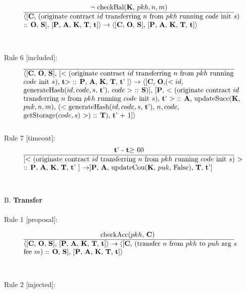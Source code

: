 \documentclass[a4paper]{llncs}
\begin{document}
\begin{equation}{}
\frac{\text{$\neg$ checkBal(\MANAGERS, $pkh, n, m$)}}{\parbox{4.2in}{\text{$\langle$[\ACCOUNTS, (originate contract ${id}$ transferring  ${n}$ from ${pkh}$ running ${code}$ init ${s}$)} \text{:: \OPERATIONS, \CONTRACTS], [\PENDING, \ACCEPTED, \MANAGERS, \CONTRACTORS, \TIME]$\rangle \rightarrow \langle$[\ACCOUNTS, \OPERATIONS, \CONTRACTS],} \text{[\PENDING, \ACCEPTED, \MANAGERS, \CONTRACTORS, \TIME]$\rangle$}}} 
\end{equation}
~\\
~\\
Rule 6 [included]:
\begin{equation}{}
\frac{}{\parbox{4.2in}{\text{$\langle$[\ACCOUNTS, \OPERATIONS, \CONTRACTS], [$<$ (originate contract ${id}$ transferring  ${n}$ from ${pkh}$ running } \\
\text{${code}$ init ${s}$), \TIME $>$ :: \PENDING, \ACCEPTED, \MANAGERS, \CONTRACTORS, \TIME' ]$\rangle \rightarrow \langle$[\ACCOUNTS, \OPERATIONS,($< id$, } \\
\text{generateHash($id, code, s$, \TIME'), $code >$ :: \CONTRACTS)], [\PENDING, $<$ (originate contract ${id}$ } \\
\text{transferring  ${n}$ from ${pkh}$ running ${code}$ init ${s}$), \TIME' $>$ :: \ACCEPTED, updateSucc(\MANAGERS, } \\
\text{$puk, n, m$), ($<$ generateHash($id, code, s$, \TIME'), $n, code$, } \\
 \text{getStorage($code, s$) $>$) :: \CONTRACTORS), \TIME' + 1]$\rangle$}}} 
\end{equation}
~\\
Rule 7 [timeout]:
\begin{equation}{}
\frac{\text{\TIME' - \TIME $\ge$ 60}}{\parbox{4.2in}{\text{[$<$ (originate contract ${id}$ transferring  ${n}$ from ${pkh}$ running ${code}$ init ${s}$) $>$ } \\
\text{:: \PENDING, \ACCEPTED, \MANAGERS, \CONTRACTORS, \TIME' ] $\rightarrow$[\PENDING, \ACCEPTED, updateCou(\MANAGERS, $puk$, False), \CONTRACTORS, \TIME']}}} 
\end{equation}
~\\
~\\
B. \textbf{Transfer}
\\
~\\
Rule 1 [proposal]:

\begin{equation}{}
\frac{\text{checkAcc($pkh$, \ACCOUNTS)  }}{\parbox{4.2in}{\text{$\langle$[\ACCOUNTS, \OPERATIONS, \CONTRACTS], [\PENDING, \ACCEPTED, \MANAGERS, \CONTRACTORS, \TIME]$\rangle \rightarrow \langle$[\ACCOUNTS, (transfer ${n}$ from ${pkh}$ to  ${puh}$ arg ${s}$ }  \\
\text{fee ${m}$) :: \OPERATIONS, \CONTRACTS], [\PENDING, \ACCEPTED, \MANAGERS, \CONTRACTORS, \TIME]$\rangle$}}} 
\end{equation}
~\\
~\\
Rule 2 [injected]:
\end{document}
